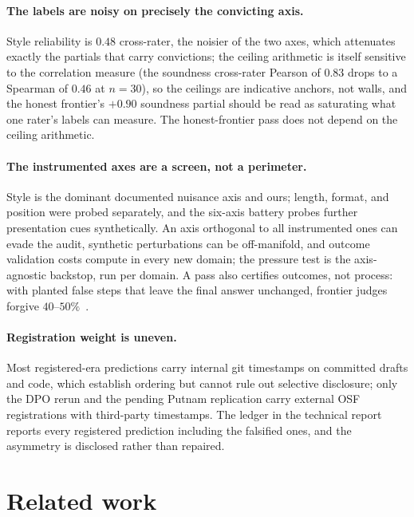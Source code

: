 \documentclass[11pt]{article}
\begin{document}
\paragraph{The labels are noisy on precisely the convicting axis.}
Style reliability is $0.48$ cross-rater, the noisier of the two axes, which attenuates exactly the partials that carry convictions; the ceiling arithmetic is itself sensitive to the correlation measure (the soundness cross-rater Pearson of $0.83$ drops to a Spearman of $0.46$ at $n{=}30$), so the ceilings are indicative anchors, not walls, and the honest frontier's $+0.90$ soundness partial should be read as saturating what one rater's labels can measure.
The honest-frontier pass does not depend on the ceiling arithmetic.

\paragraph{The instrumented axes are a screen, not a perimeter.}
Style is the dominant documented nuisance axis and ours; length, format, and position were probed separately, and the six-axis battery probes further presentation cues synthetically.
An axis orthogonal to all instrumented ones can evade the audit, synthetic perturbations can be off-manifold, and outcome validation costs compute in every new domain; the pressure test is the axis-agnostic backstop, run per domain.
A pass also certifies outcomes, not process: with planted false steps that leave the final answer unchanged, frontier judges forgive $40$--$50\%$~\cite{companionB}.

\paragraph{Registration weight is uneven.}
Most registered-era predictions carry internal git timestamps on committed drafts and code, which establish ordering but cannot rule out selective disclosure; only the DPO rerun and the pending Putnam replication carry external OSF registrations with third-party timestamps.
The ledger in the technical report reports every registered prediction including the falsified ones, and the asymmetry is disclosed rather than repaired.

\section{Related work}
\label{sec:related}
\end{document}
